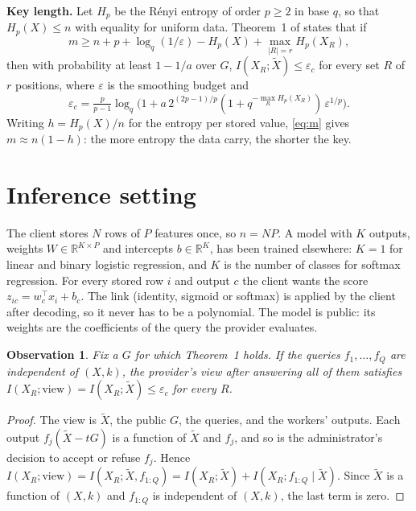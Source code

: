 \documentclass[conference]{IEEEtran}
\newtheorem{observation}{Observation}
\theoremstyle{remark}
\newcommand{\Xt}{\tilde{X}}
\begin{document}
\textbf{Key length.} Let $H_p$ be the R\'enyi entropy of order $p\ge2$ in base $q$, so that
$H_p(X)\le n$ with equality for uniform data. Theorem~1 of \cite{icc2025} states that if
\begin{equation}\label{eq:m}
m \ge n + p + \log_q(1/\varepsilon) - H_p(X) + \max_{|R|=r} H_p(X_R),
\end{equation}
then with probability at least $1-1/a$ over $G$, $I(X_R;\Xt)\le\varepsilon_c$ for every
set $R$ of $r$ positions, where $\varepsilon$ is the smoothing budget and
\[
\varepsilon_c=\tfrac{p}{p-1}\log_q\!\big(1+a\,2^{(2p-1)/p}(1+q^{-\max_R H_p(X_R)})\,\varepsilon^{1/p}\big).
\]
Writing $h=H_p(X)/n$ for the entropy per stored value, \eqref{eq:m} gives $m\approx n(1-h)$: the more entropy
the data carry, the shorter the key.

\section{Inference setting}\label{sec:setting}

The client stores $N$ rows of $P$ features once, so $n=NP$. A model with $K$ outputs,
weights $W\in\mathbb{R}^{K\times P}$ and intercepts $b\in\mathbb{R}^K$, has been trained
elsewhere: $K=1$ for linear and binary logistic regression, and $K$ is the number of
classes for softmax regression. For every stored row $i$ and output $c$ the client wants
the score $z_{ic}=w_c^\top x_i+b_c$. The link (identity, sigmoid or softmax) is applied by
the client after decoding, so it never has to be a polynomial. The model is public: its
weights are the coefficients of the query the provider evaluates.

\begin{observation}\label{obs:inference}
Fix a $G$ for which Theorem~1 holds. If the queries $f_1,\dots,f_Q$ are independent of
$(X,k)$, the provider's view after answering all of them satisfies
$I(X_R;\text{view})=I(X_R;\Xt)\le\varepsilon_c$ for every $R$.
\end{observation}
\begin{proof}
The view is $\Xt$, the public $G$, the queries, and the workers' outputs. Each output
$f_j(\Xt-tG)$ is a function of $\Xt$ and $f_j$, and so is the administrator's decision to
accept or refuse $f_j$. Hence
$I(X_R;\text{view})=I(X_R;\Xt,f_{1:Q})=I(X_R;\Xt)+I(X_R;f_{1:Q}\mid\Xt)$. Since $\Xt$ is a
function of $(X,k)$ and $f_{1:Q}$ is independent of $(X,k)$, the last term is zero.
\end{proof}
\end{document}
